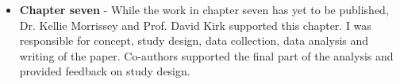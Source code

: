 \begin{itemize}
    \item \textbf{Chapter seven} - While the work in chapter seven has yet to be published, Dr. Kellie Morrissey and Prof. David Kirk supported this chapter. I was responsible for concept, study design, data collection, data analysis and writing of the paper. Co-authors supported the final part of the analysis and provided feedback on study design.
\end{itemize}